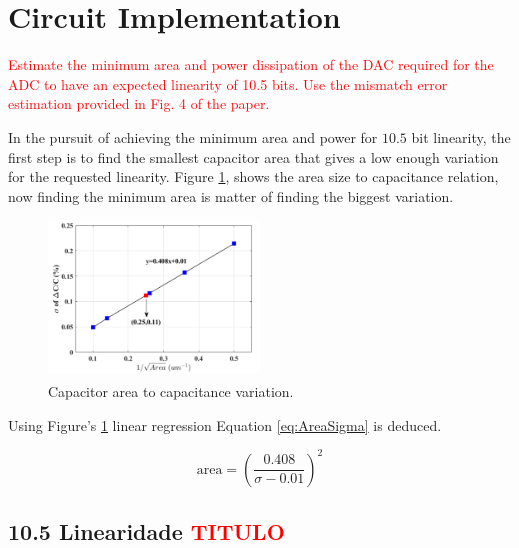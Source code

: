 \section{Circuit Implementation}
\label{sec:implementation}
\textcolor{red}{Estimate the minimum area and power dissipation of the DAC
required for the ADC to have an expected linearity of 10.5 bits. Use the
mismatch error estimation provided in Fig. 4 of the paper.}

In the pursuit of achieving the minimum area and power for $10.5$ bit linearity, the first step is to find the smallest capacitor area that gives a low enough variation for the requested linearity. Figure \ref{fig:Csize2sigma}, shows the area size to capacitance relation, now finding the minimum area is matter of finding the biggest variation. 

\begin{figure}[H]

    \centering
    \includegraphics*[width=0.5\textwidth]{Images/Csize2sigma.png}
    \caption{Capacitor area to capacitance variation.\textsuperscript{\cite{paper}}}

    \label{fig:Csize2sigma}
\end{figure}

Using Figure's \ref{fig:Csize2sigma} linear regression Equation \ref{eq:AreaSigma} is deduced.

\begin{equation}
    \text{area} = \left(\frac{0.408}{\sigma - 0.01}\right)^2
    \label{eq:AreaSigma}
\end{equation}

\subsection{10.5 Linearidade \textcolor{red}{TITULO}}



